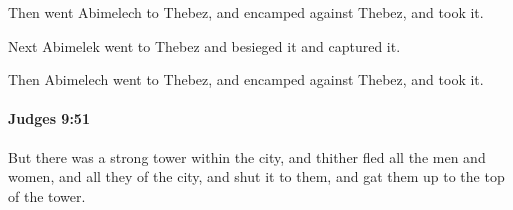 			\begin{versebox}
					\item[BHS] 
					\item[ASV] Then went Abimelech to Thebez, and encamped against Thebez, and took it.
					\item[NIV] Next Abimelek went to Thebez and besieged it and captured it.
					\item[NRSV] Then Abimelech went to Thebez, and encamped against Thebez, and took it.
			\end{versebox}

		\paragraph{Judges 9:51} %
			\label{JUDGES-9-51}

			But there was a strong tower within the city, and thither fled all the men and women, and all they of the city, and shut it to them, and gat them up to the top of the tower.

